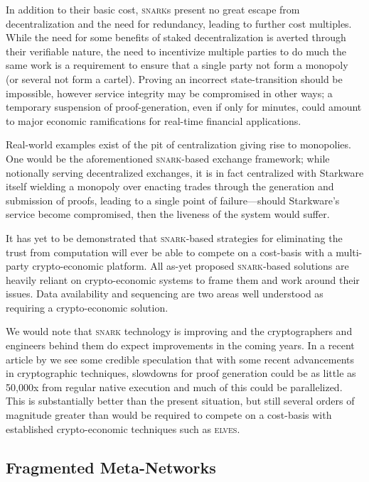 In addition to their basic cost, \textsc{snark}s present no great escape from decentralization and the need for redundancy, leading to further cost multiples. While the need for some benefits of staked decentralization is averted through their verifiable nature, the need to incentivize multiple parties to do much the same work is a requirement to ensure that a single party not form a monopoly (or several not form a cartel). Proving an incorrect state-transition should be impossible, however service integrity may be compromised in other ways; a temporary suspension of proof-generation, even if only for minutes, could amount to major economic ramifications for real-time financial applications.

Real-world examples exist of the pit of centralization giving rise to monopolies. One would be the aforementioned \textsc{snark}-based exchange framework; while notionally serving decentralized exchanges, it is in fact centralized with Starkware itself wielding a monopoly over enacting trades through the generation and submission of proofs, leading to a single point of failure---should Starkware's service become compromised, then the liveness of the system would suffer.

It has yet to be demonstrated that \textsc{snark}-based strategies for eliminating the trust from computation will ever be able to compete on a cost-basis with a multi-party crypto-economic platform. All as-yet proposed \textsc{snark}-based solutions are heavily reliant on crypto-economic systems to frame them and work around their issues. Data availability and sequencing are two areas well understood as requiring a crypto-economic solution.

We would note that \textsc{snark} technology is improving and the cryptographers and engineers behind them do expect improvements in the coming years. In a recent article by \cite{thaler2023technical} we see some credible speculation that with some recent advancements in cryptographic techniques, slowdowns for proof generation could be as little as 50,000x from regular native execution and much of this could be parallelized. This is substantially better than the present situation, but still several orders of magnitude greater than would be required to compete on a cost-basis with established crypto-economic techniques such as \textsc{elves}.

\subsection{Fragmented Meta-Networks}

